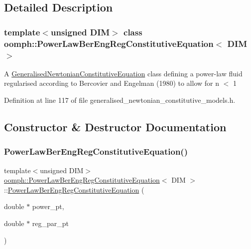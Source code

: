 \subsection{Detailed Description}
\subsubsection*{template$<$unsigned D\+IM$>$\newline
class oomph\+::\+Power\+Law\+Ber\+Eng\+Reg\+Constitutive\+Equation$<$ D\+I\+M $>$}

A \hyperlink{classoomph_1_1GeneralisedNewtonianConstitutiveEquation}{Generalised\+Newtonian\+Constitutive\+Equation} class defining a power-\/law fluid regularised according to Bercovier and Engelman (1980) to allow for n $<$ 1 

Definition at line 117 of file generalised\+\_\+newtonian\+\_\+constitutive\+\_\+models.\+h.



\subsection{Constructor \& Destructor Documentation}
\mbox{\label{classoomph_1_1PowerLawBerEngRegConstitutiveEquation_af60b42c2f688e029aaaf7011aefda323}} 
\subsubsection{\texorpdfstring{Power\+Law\+Ber\+Eng\+Reg\+Constitutive\+Equation()}{PowerLawBerEngRegConstitutiveEquation()}}
{\footnotesize\ttfamily template$<$unsigned D\+IM$>$ \\
\hyperlink{classoomph_1_1PowerLawBerEngRegConstitutiveEquation}{oomph\+::\+Power\+Law\+Ber\+Eng\+Reg\+Constitutive\+Equation}$<$ D\+IM $>$\+::\hyperlink{classoomph_1_1PowerLawBerEngRegConstitutiveEquation}{Power\+Law\+Ber\+Eng\+Reg\+Constitutive\+Equation} (\begin{DoxyParamCaption}\item[{double $\ast$}]{power\+\_\+pt,  }\item[{double $\ast$}]{reg\+\_\+par\+\_\+pt }\end{DoxyParamCaption})\hspace{0.3cm}{\ttfamily [inline]}}



